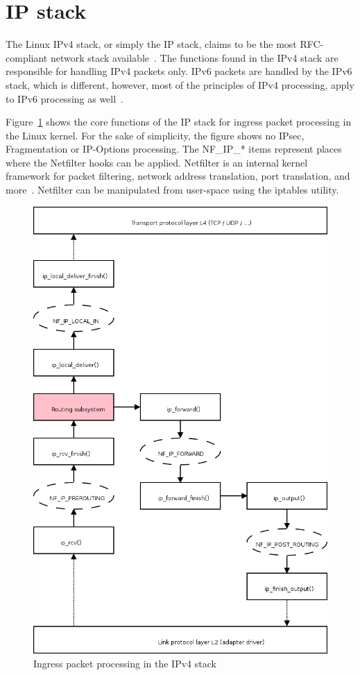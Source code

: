 
\section{IP stack}\label{sec:linux-ip}
The Linux IPv4 stack, or simply the IP stack, claims to be the most RFC-compliant network stack available~\cite{linux-foundation-toe}.
The functions found in the IPv4 stack are responsible for handling IPv4 packets only.
IPv6 packets are handled by the IPv6 stack, which is different,
however, most of the principles of IPv4 processing, apply to IPv6 processing as well~\cite{linux-kernel-networking}.

Figure~\ref{fig:linux-ingress-packet} shows the core functions of the IP stack for ingress packet processing in the Linux kernel.
For the sake of simplicity, the figure shows no IPsec, Fragmentation or IP-Options processing.
The NF\_IP\_* items represent places where the Netfilter hooks can be applied.
Netfilter is an internal kernel framework for packet filtering,
network address translation, port translation, and more~\cite{netfilter}.
Netfilter can be manipulated from user-space using the iptables utility.

\begin{figure}
	\centering
	\includegraphics[width=12cm,keepaspectratio]{fig/kernel-layer3-flow.png}
	\caption{Ingress packet processing in the IPv4 stack}
	\label{fig:linux-ingress-packet}
	\bigskip
\end{figure}


